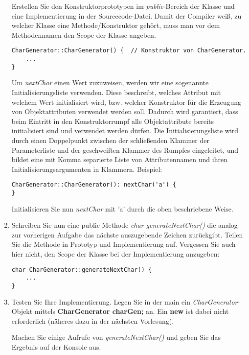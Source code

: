 \documentclass[
  accentcolor=tud1c,	%
  colorbacktitle,		%
  inverttitle,			%
  german,				%
  twoside
]{tudexercise}
\begin{document}
\begin{enumerate}
Erstellen Sie den Konstruktorprototypen im \emph{public}-Bereich der Klasse und eine Implementierung in der Sourcecode-Datei. Damit der Compiler weiß, zu welcher Klasse eine Methode/Konstruktor gehört, muss man vor dem Methodennamen den Scope der Klasse angeben.

\begin{lstlisting}
CharGenerator::CharGenerator() {  // Konstruktor von CharGenerator.
	...
}
\end{lstlisting}

Um \emph{nextChar} einen Wert zuzuweisen, werden wir eine sogenannte Initialisierungsliste verwenden. Diese beschreibt, welches Attribut mit welchem Wert initialisiert wird, bzw. welcher Konstruktor für die Erzeugung von Objektattributen verwendet werden soll. Dadurch wird garantiert, dass beim Eintritt in den Konstruktorrumpf alle Objektattribute bereits initialisiert sind und verwendet werden dürfen. Die Initialisierungsliste wird durch einen Doppelpunkt zwischen der schließenden Klammer der Parameterliste und der geschweiften Klammer des Rumpfes eingeleitet, und bildet eine mit Komma separierte Liste von Attributennamen und ihren Initialisierungsargumenten in Klammern. Beispiel:

\begin{lstlisting}
CharGenerator::CharGenerator(): nextChar('a') {
}
\end{lstlisting}

Initialisieren Sie nun \emph{nextChar} mit 'a' durch die oben beschriebene Weise.

\item Schreiben Sie nun eine public Methode \emph{char generateNextChar()} die analog zur vorherigen Aufgabe das nächste auszugebende Zeichen zurückgibt. Teilen Sie die Methode in Prototyp und Implementierung auf. Vergessen Sie auch hier nicht, den Scope der Klasse bei der Implementierung anzugeben:

\begin{lstlisting}
char CharGenerator::generateNextChar() {
	...
}
\end{lstlisting}

\item Testen Sie Ihre Implementierung. Legen Sie in der main ein \emph{CharGenerator}-Objekt mittels \textbf{CharGenerator charGen;} an. Ein \textbf{new} ist dabei nicht erforderlich (näheres dazu in der nächsten Vorlesung).

Machen Sie einige Aufrufe von \emph{generateNextChar()} und geben Sie das Ergebnis auf der Konsole aus.


\end{enumerate}
\end{document}
